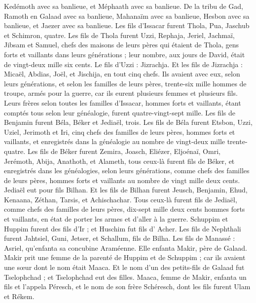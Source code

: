 \begin{multicols}{2}
Kedémoth avec sa banlieue, et Méphaath avec sa banlieue.
De la tribu de Gad, Ramoth en Galaad avec sa banlieue, Mahanaïm avec sa banlieue,
Hesbon avec sa banlieue, et Jaezer avec sa banlieue.
\VerseOne{}Les fils d'Issacar furent  Thola, Pua, Jaschub et Schimron, quatre.
Les fils de Thola furent Uzzi, Rephaja, Jeriel, Jachmaï, Jibsam et Samuel, chefs des maisons de leurs pères qui étaient de Thola, gens forts et vaillants dans leurs générations ; leur nombre, aux jours de David, était de vingt-deux mille six cents.
Le fils d’Uzzi : Jizrachja. Et les fils de Jizrachja : Micaël, Abdias, Joël, et Jischija, en tout cinq chefs.
Ils avaient avec eux, selon leurs générations, et selon les familles de leurs pères, trente-six mille hommes de troupe, armés pour la guerre, car ils eurent plusieurs femmes et plusieurs fils.
Leurs frères selon toutes les familles d'Issacar, hommes forts et vaillants, étant comptés tous selon leur généalogie, furent quatre-vingt-sept mille.
Les fils de Benjamin furent Béla, Béker et Jediaël, trois.
Les fils de Béla furent  Etsbon, Uzzi, Uziel, Jerimoth et Iri, cinq chefs des familles de leurs pères, hommes forts et vaillants, et enregistrés dans la généalogie au nombre de vingt-deux mille trente-quatre.
Les fils de Béker furent  Zemira, Joasch, Eliézer, Eljoénaï, Omri, Jerémoth, Abija, Anathoth, et Alameth, tous ceux-là furent fils de Béker,
et enregistrés dans les généalogies, selon leurs générations, comme chefs des familles de leurs pères, hommes forts et vaillants au nombre de vingt mille deux cents.
Jediaël eut pour fils Bilhan. Et les fils de Bilhan furent Jeusch, Benjamin, Ehud, Kenaana, Zéthan, Tarsis, et Achischachar.
Tous ceux-là furent fils de Jediaël, comme chefs des familles de leurs pères, dix-sept mille deux cents hommes forts et vaillants, en état de porter les armes et d’aller à la guerre.
Schuppim et Huppim furent  des fils d’Ir ; et Huschim fut fils d' Acher.
Les fils de Nephthali furent Jahtsiel, Guni, Jetser, et Schallum, fils de Bilha.
Les fils de Manassé : Asriel, qu’enfanta sa concubine Araméenne. Elle enfanta Makir, père de Galaad.
Makir prit une femme de la parenté de Huppim et de Schuppim ; car ils avaient une sœur dont le nom était Maaca. Et le nom d'un des petits-fils de Galaad fut Tselophchad ; et Tselophchad eut des filles.
Maaca, femme de Makir, enfanta un fils et l'appela Péresch, et le nom de son frère Schéresch, dont les fils furent Ulam et Rékem.

\end{multicols}
